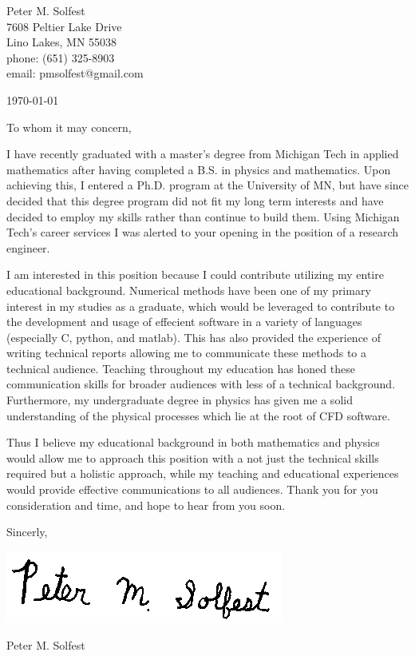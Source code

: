 \documentclass[letterpaper,12pt]{article}
\begin{document}
Peter M. Solfest\\
7608 Peltier Lake Drive\\
Lino Lakes, MN 55038\\
phone: (651) 325-8903\\
email: pmsolfest@gmail.com

\today


To whom it may concern, %

I have recently graduated with a master's degree from Michigan Tech in applied mathematics after
having completed a B.S. in physics and mathematics.
Upon achieving this, I entered a Ph.D. program at the University of MN, but have since
decided that this degree program did not fit my long term interests and have decided to
employ my skills rather than continue to build them.
Using Michigan Tech's career services I was alerted to your opening in the position of a
research engineer.

I am interested in this position because I could contribute utilizing my entire educational background.
Numerical methods have been one of my primary interest in my studies as a graduate,
which would be leveraged to contribute to the development and usage of effecient software in a 
variety of languages (especially C, python, and matlab).
This has also provided the experience of writing technical reports allowing me to 
communicate these methods to a technical audience.
Teaching throughout my education has honed these communication skills 
for broader audiences with less of a technical background.
Furthermore, my undergraduate degree in physics has given me a solid understanding of the
physical processes which lie at the root of CFD software.

Thus I believe my educational background in both mathematics and physics would allow me to approach 
this position with a not just the technical skills required but a holistic approach,
while my teaching and educational experiences would provide effective communications
to all audiences.
Thank you for you consideration and time, and hope to hear from you soon.

Sincerly,

\includegraphics[height=.5in]{signature.png}

Peter M. Solfest
\end{document}
